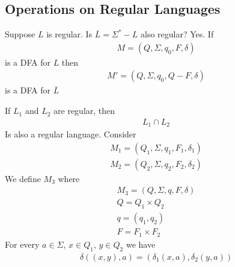 \documentclass[a4paper]{article}
\theoremstyle{plain}
\theoremstyle{definition}
\newtheorem{defn}{Definition}[section]
\theoremstyle{remark}
\begin{document}
\subsection{Operations on Regular Languages}
\begin{tcolorbox}[colback=black!3!white,colframe=black!60!white,title=\begin{defn}Complement Language \label{Complement Language}\end{defn}]
Suppose $L$ is regular. Is $\overline{L} = \Sigma^{*}-L$ also regular? Yes. If
\begin{align}
M = (Q,\Sigma,q_0,F,\delta)
\end{align}
is a DFA for $L$ then
\begin{align}
	M'=(Q,\Sigma,q_0, Q-F, \delta)
\end{align}
is a DFA for $\overline{L}$
\end{tcolorbox}
\begin{tcolorbox}[colback=black!3!white,colframe=black!60!white,title=\begin{defn}Intersection \label{Intersection}\end{defn}]
If $L_1$ and $L_2$ are regular, then
\begin{align}
L_1 \cap L_2
\end{align}
Is also a regular language. Consider
\begin{align}
	M_1 = (Q_1,\Sigma,q_1,F_1,\delta_1) \\
	M_2=(Q_2,\Sigma,q_2,F_2,\delta_2)
\end{align}
We define $M_3$ where
\begin{align}
	M_3 = (Q,\Sigma, q, F, \delta) \\
	Q = Q_1 \times Q_2 \\
	q = (q_1,q_2) \\
	F = F_1 \times F_2
\end{align}
For every $a \in \Sigma$, $x \in Q_1$, $y\in Q_2$ we have
\begin{align}
	\delta((x,y),a) = (\delta_1(x,a),\delta_2(y,a))
\end{align}
\end{tcolorbox}
\end{document}
